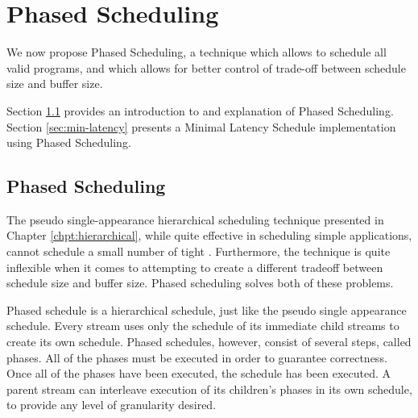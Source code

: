 \section{Phased Scheduling}
\label{chpt:phased}

We now propose Phased Scheduling, a technique which allows to
schedule all valid {\StreamIt} programs, and which allows for
better control of trade-off between schedule size and buffer size.

Section \ref{sec:phased:intro} provides an introduction to and
explanation of Phased Scheduling. Section \ref{sec:min-latency}
presents a Minimal Latency Schedule implementation using Phased
Scheduling.

\subsection{Phased Scheduling}
\label{sec:phased:intro}

The pseudo single-appearance hierarchical scheduling technique
presented in Chapter \ref{chpt:hierarchical}, while quite
effective in scheduling simple applications, cannot schedule a
small number of tight {{\feedbackloops}}. Furthermore, the technique
is quite inflexible when it comes to attempting to create a
different tradeoff between schedule size and buffer size. Phased
scheduling solves both of these problems.

Phased schedule is a hierarchical schedule, just like the pseudo
single appearance schedule. Every stream uses only the schedule of
its immediate child streams to create its own schedule. Phased
schedules, however, consist of several steps, called phases. All
of the phases must be executed in order to guarantee correctness.
Once all of the phases have been executed, the schedule has been
executed. A parent stream can interleave execution of its
children's phases in its own schedule, to provide any level of
granularity desired.

